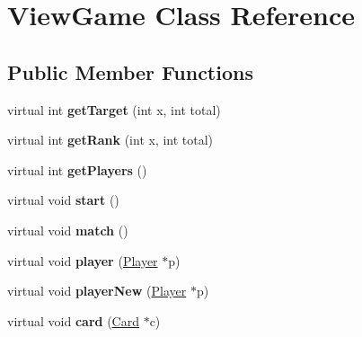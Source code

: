 \hypertarget{class_view_game}{\section{View\-Game Class Reference}
\label{class_view_game}
}
\subsection*{Public Member Functions}
\begin{DoxyCompactItemize}
\item 
\hypertarget{class_view_game_aff44e7f03fe7b2d4b478f29a2344be09}{virtual int {\bfseries get\-Target} (int x, int total)}\label{class_view_game_aff44e7f03fe7b2d4b478f29a2344be09}

\item 
\hypertarget{class_view_game_aee35e120f9c641b19ebf077ab47df6be}{virtual int {\bfseries get\-Rank} (int x, int total)}\label{class_view_game_aee35e120f9c641b19ebf077ab47df6be}

\item 
\hypertarget{class_view_game_ad6ee566807d9bd46d25db60723a4e382}{virtual int {\bfseries get\-Players} ()}\label{class_view_game_ad6ee566807d9bd46d25db60723a4e382}

\item 
\hypertarget{class_view_game_a2f0d9914e6b3b21cda74f8a5531e29e7}{virtual void {\bfseries start} ()}\label{class_view_game_a2f0d9914e6b3b21cda74f8a5531e29e7}

\item 
\hypertarget{class_view_game_aca4808d68b7790859f17be0f0930b528}{virtual void {\bfseries match} ()}\label{class_view_game_aca4808d68b7790859f17be0f0930b528}

\item 
\hypertarget{class_view_game_ac03d9f0e678e1dc5719a99f388514cc8}{virtual void {\bfseries player} (\hyperlink{class_player}{Player} $\ast$p)}\label{class_view_game_ac03d9f0e678e1dc5719a99f388514cc8}

\item 
\hypertarget{class_view_game_a0dd3b1e2f2f332c520296f09bff9abcc}{virtual void {\bfseries player\-New} (\hyperlink{class_player}{Player} $\ast$p)}\label{class_view_game_a0dd3b1e2f2f332c520296f09bff9abcc}

\item 
\hypertarget{class_view_game_a57eb74de3b668b966e1420b011d9373e}{virtual void {\bfseries card} (\hyperlink{class_card}{Card} $\ast$c)}\label{class_view_game_a57eb74de3b668b966e1420b011d9373e}


\end{DoxyCompactItemize}
